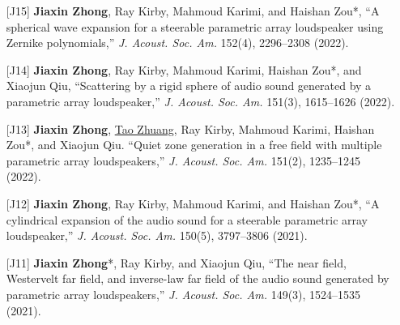 \documentclass[10pt,a4paper,ragged2e,withhyper]{altacv}
\newcommand{\PubJournal}[1]{\textit{#1}}
\newcommand{\PubTitle}[1]{``{#1,}''}
\newcommand{\PubCorAuthor}[1]{#1*}
\newcommand{\PubMe}[1]{\textbf{#1}}
\begin{document}
\begin{itemize}[leftmargin = 30pt]
    \item[{[J15]}]
        \PubMe{Jiaxin Zhong}, Ray Kirby, Mahmoud Karimi, and \PubCorAuthor{Haishan Zou},
        \PubTitle{A spherical wave expansion for a steerable parametric array loudspeaker using Zernike polynomials} 
        \PubJournal{J. Acoust. Soc. Am.} 
        152(4), 2296--2308 (2022).
        \href{https://doi.org/10.1121/10.0014832}{\color{accent}\aiDoi}
        \href{https://github.com/JiaxinZhong/JiaxinZhong.github.io/raw/master/publications/journal/Zhong2022-JASA-PAL_Zernike.pdf}{\color{accent}\faFilePdf[regular]}

    \item[{[J14]}]
        \PubMe{Jiaxin Zhong}, Ray Kirby, Mahmoud Karimi, \PubCorAuthor{Haishan Zou}, and Xiaojun Qiu,
        \PubTitle{Scattering by a rigid sphere of audio sound generated by a parametric array loudspeaker} 
        \PubJournal{J. Acoust. Soc. Am.} 
        151(3), 1615--1626 (2022).
        \href{https://doi.org/10.1121/10.0009750}{\color{accent}\aiDoi}
        \href{https://github.com/JiaxinZhong/JiaxinZhong.github.io/raw/master/publications/journal/Zhong2022-JASA-PAL_sphere.pdf}{\color{accent}\faFilePdf[regular]}

    \item[{[J13]}]
        \PubMe{Jiaxin Zhong}, \underline{Tao Zhuang}, Ray Kirby, Mahmoud Karimi, \PubCorAuthor{Haishan Zou}, and Xiaojun
Qiu. 
        \PubTitle{Quiet zone generation in a free field with multiple parametric array loudspeakers} 
        \PubJournal{J. Acoust. Soc. Am.} 151(2), 1235--1245 (2022).
        \href{https://doi.org/10.1121/10.0009587}{\color{accent}\aiDoi}
        \href{https://github.com/JiaxinZhong/JiaxinZhong.github.io/raw/master/publications/journal/Zhong2022-JASA-PAL_ANC.pdf}{\color{accent}\faFilePdf[regular]}

    \item[{[J12]}]
        \PubMe{Jiaxin Zhong}, Ray Kirby, Mahmoud Karimi, and \PubCorAuthor{Haishan Zou}, 
        \PubTitle{A cylindrical expansion of the audio sound for a steerable parametric array loudspeaker}
        \PubJournal{J. Acoust. Soc. Am.}
        150(5), 3797--3806 (2021).
        \href{https://doi.org/10.1121/10.0007280}{\color{accent}\aiDoi}
        \href{https://github.com/JiaxinZhong/JiaxinZhong.github.io/raw/master/publications/journal/Zhong2021-JASA-PAL_cylindrical_expansion.pdf}{\color{accent}\faFilePdf[regular]}

    \item[{[J11]}]
        \PubCorAuthor{\PubMe{Jiaxin Zhong}}, Ray Kirby, and Xiaojun Qiu,         
        \PubTitle{The near field, Westervelt far field, and inverse-law far field of the audio sound generated by parametric array loudspeakers}
        \PubJournal{J. Acoust. Soc. Am.}
        149(3), 1524--1535 (2021).
        \href{https://doi.org/10.1121/10.0003606}{\color{accent}\aiDoi}
        \href{https://github.com/JiaxinZhong/JiaxinZhong.github.io/raw/master/publications/journal/Zhong2021-JASA-PAL_sound_field.pdf}{\color{accent}\faFilePdf[regular]}


\end{itemize}
\end{document}
